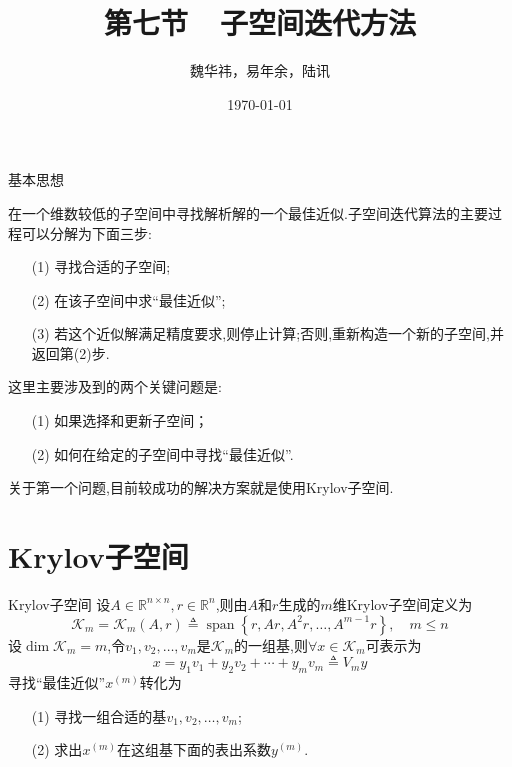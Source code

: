 \documentclass[notheorems,serif]{beamer}
\renewcommand{\normalsize}{\wuhao}
\newcommand{\wuhao}{\fontsize{10.5pt}{\baselineskip}\selectfont}
\begin{document}
\title[]{第七节~~子空间迭代方法}
\author[]{魏华祎，易年余，陆讯}
\date{\today}
\frame[plain]{\titlepage}


\begin{frame}{基本思想}

\normalsize
在一个{\color{blue}维数较低的子空间}中寻找解析解的一个{\color{blue}最佳近似}.子空间迭代算法的主要过程可以分解为下面三步:

\begin{itemize}
\item[(1)] 寻找合适的子空间;\\
	\item[(2)] 在该子空间中求“最佳近似”;\\
	\item[(3)] 若这个近似解满足精度要求,则停止计算;否则,重新构造一个新的子空间,并返回第(2)步.
\end{itemize}
	
这里主要涉及到的{\color{blue}两个关键问题}是:
\begin{itemize}
	\item[(1)] 如果选择和更新子空间；
	\item[(2)] 如何在给定的子空间中寻找“最佳近似”.
\end{itemize}
关于第一个问题,目前较成功的解决方案就是使用{\color{blue}Krylov子空间}.\\
\end{frame}

\section{Krylov子空间}
\begin{frame}
{Krylov子空间}
设$A \in \mathbb{R}^{n \times n}, r \in \mathbb{R}^{n}$,则由$A$和$r$生成的$m$维{\color{blue}Krylov子空间}定义为
$$
\boxed{\mathcal{K}_{m}=\mathcal{K}_{m}(A, r) \triangleq \operatorname{span}\left\{r, A r, A^{2} r, \ldots, A^{m-1} r\right\}, \quad m \leq n}
$$
设$\operatorname{dim} \mathcal{K}_{m}=m$,令$v_{1}, v_{2}, \ldots, v_{m}$是$\mathcal{K}_{m}$的一组基,则$\forall x \in \mathcal{K}_{m}$可表示为
$$x=y_{1} v_{1}+y_{2} v_{2}+\cdots+y_{m} v_{m} \triangleq V_{m} y$$
{\color{blue}寻找“最佳近似”$x^{(m)}$}转化为
\begin{itemize}
	\item[(1)] 寻找一组合适的基$v_{1}, v_{2}, \ldots, v_{m}$;
	\item[(2)] 求出$x^{(m)}$在这组基下面的表出系数$y^{(m)}$.
\end{itemize}
\end{frame}
\end{document}
